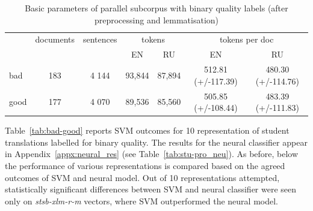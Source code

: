 \begin{table}[]
	\centering
	\begin{tabular}{l|c|c|cc|cc}
		\toprule
		       & documents & sentences & \multicolumn{2}{c|}{tokens} & \multicolumn{2}{c}{tokens per doc} \\
		       &           &           & EN      &  RU              & EN      &  RU \\
		\midrule  
		bad     & 183  	   & 4 144    & 93,844 & 87,894           & 512.81 (+/-117.39) & 480.30 (+/-114.76) \\  
		good    & 177      & 4 070    & 89,536 & 85,560           & 505.85 (+/-108.44) & 483.39 (+/-111.83) \\ 
		\bottomrule
	\end{tabular}
	\caption{\label{tab:binqua_pars} Basic parameters of parallel subcorpus with binary quality labels (after preprocessing and lemmatisation)}
\end{table}

Table~\ref{tab:bad-good} reports SVM outcomes for 10 representation of student translations labelled for binary quality. The results for the neural classifier appear in Appendix~\ref{appx:neural_res} (see Table~\ref{tab:stu-pro_neu}). As before, below the performance of various representations is compared based on the agreed outcomes of SVM and neural model.
Out of 10 representations attempted, statistically significant differences between SVM and neural classifier were seen only on \textit{stsb-xlm-r-m} vectors, where SVM outperformed the neural model. 

